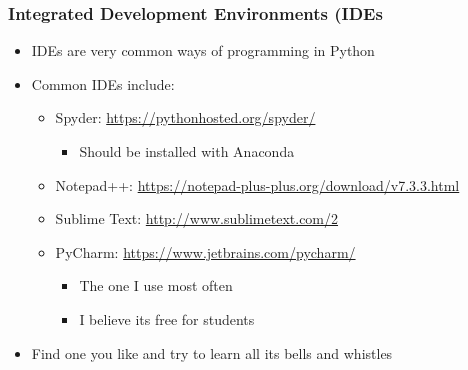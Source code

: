 \documentclass[mini frame in current subsection]{beamer}
\begin{document}
		\begin{frame}
			\frametitle{Integrated Development Environments (IDEs}
			\begin{itemize}
				\vfill \item  IDEs are very common ways of programming in Python
				\vfill \item  Common IDEs include:
					\begin{itemize}
						\item  Spyder:  \url{https://pythonhosted.org/spyder/}
							\begin{itemize}
								\item  Should be installed with Anaconda
							\end{itemize}
						\item  Notepad++:  \url{https://notepad-plus-plus.org/download/v7.3.3.html}
						\item  Sublime Text:  \url{http://www.sublimetext.com/2}
						\item  PyCharm:  \url{https://www.jetbrains.com/pycharm/}
							\begin{itemize}
								\item  The one I use most often
								\item  I believe its free for students
							\end{itemize}
					\end{itemize}
				\vfill \item  Find one you like and try to learn all its bells and whistles
			\end{itemize}
		\end{frame}
		
\end{document}
